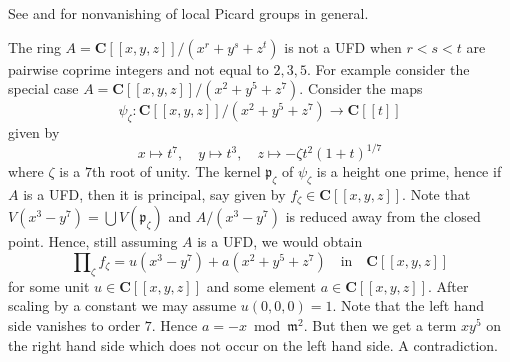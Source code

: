 \begin{example}
\label{example-completion-not-factorial}
\begin{reference}
See \cite{Brieskorn} and \cite{Lipman-rational} for nonvanishing of
local Picard groups in general.
\end{reference}
The ring $A = \mathbf{C}[[x, y, z]]/(x^r + y^s + z^t)$
is not a UFD when $r < s < t$ are pairwise coprime integers
and not equal to $2, 3, 5$. For example consider the special
case $A = \mathbf{C}[[x, y, z]]/(x^2 + y^5 + z^7)$.
Consider the maps
$$
\psi_\zeta : \mathbf{C}[[x, y, z]]/(x^2 + y^5 + z^7) \to \mathbf{C}[[t]]
$$
given by
$$
x \mapsto t^7,\quad
y \mapsto t^3,\quad
z \mapsto -\zeta t^2(1 + t)^{1/7}
$$
where $\zeta$ is a $7$th root of unity. The kernel $\mathfrak p_\zeta$
of $\psi_\zeta$ is a height one prime, hence if $A$ is a UFD, then
it is principal, say given by $f_\zeta \in \mathbf{C}[[x, y, z]]$.
Note that $V(x^3 - y^7) = \bigcup V(\mathfrak p_\zeta)$
and $A/(x^3 - y^7)$ is reduced away from the closed point. Hence,
still assuming $A$ is a UFD, we would obtain
$$
\prod\nolimits_\zeta f_\zeta = u(x^3 - y^7) + a(x^2 + y^5 + z^7)
\quad\text{in}\quad
\mathbf{C}[[x, y, z]]
$$
for some unit $u \in \mathbf{C}[[x, y, z]]$ and some
element $a \in \mathbf{C}[[x, y, z]]$. After scaling by a constant
we may assume $u(0, 0, 0) = 1$. Note that the left hand side vanishes to
order $7$. Hence $a = - x \bmod \mathfrak m^2$. But then we get a term
$xy^5$ on the right hand side which does not occur on the left
hand side. A contradiction.
\end{example}

